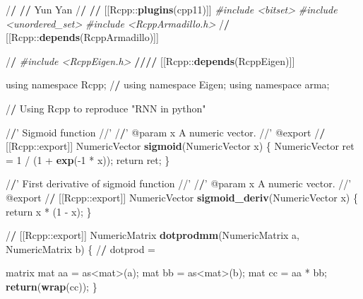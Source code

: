\documentclass[]{article}
\newenvironment{Shaded}{\begin{snugshade}}{\end{snugshade}}
\newcommand{\KeywordTok}[1]{\textcolor[rgb]{0.13,0.29,0.53}{\textbf{{#1}}}}
\newcommand{\DecValTok}[1]{\textcolor[rgb]{0.00,0.00,0.81}{{#1}}}
\newcommand{\StringTok}[1]{\textcolor[rgb]{0.31,0.60,0.02}{{#1}}}
\newcommand{\CommentTok}[1]{\textcolor[rgb]{0.56,0.35,0.01}{\textit{{#1}}}}
\newcommand{\ErrorTok}[1]{\textcolor[rgb]{0.64,0.00,0.00}{\textbf{{#1}}}}
\newcommand{\NormalTok}[1]{{#1}}
\begin{document}
\begin{Shaded}
\begin{Highlighting}[]
\NormalTok{/}\ErrorTok{/}\StringTok{ }
\ErrorTok{//}\StringTok{ }\NormalTok{Yun Yan}
\NormalTok{/}\ErrorTok{/}\StringTok{ }
\ErrorTok{//}\StringTok{ }\NormalTok{[[Rcpp::}\KeywordTok{plugins}\NormalTok{(cpp11)]]}
\CommentTok{#include <bitset>}
\CommentTok{#include <unordered_set>}
\CommentTok{#include <RcppArmadillo.h>}
\NormalTok{/}\ErrorTok{/}\StringTok{ }\NormalTok{[[Rcpp::}\KeywordTok{depends}\NormalTok{(RcppArmadillo)]]}

\NormalTok{/}\ErrorTok{/}\StringTok{ }\CommentTok{#include <RcppEigen.h>}
\ErrorTok{////}\StringTok{ }\NormalTok{[[Rcpp::}\KeywordTok{depends}\NormalTok{(RcppEigen)]]}

\NormalTok{using namespace Rcpp;}
\NormalTok{/}\ErrorTok{/}\StringTok{ }\NormalTok{using namespace Eigen;}
\NormalTok{using namespace arma;}


\NormalTok{/}\ErrorTok{/}\StringTok{ }\NormalTok{Using Rcpp to reproduce }\StringTok{"RNN in python"}

\NormalTok{/}\ErrorTok{/}\StringTok{' Sigmoid function}
\StringTok{//'}
\NormalTok{/}\ErrorTok{/}\StringTok{' @param x A numeric vector.}
\StringTok{//'} \NormalTok{@export}
\NormalTok{/}\ErrorTok{/}\StringTok{ }\NormalTok{[[Rcpp::export]]}
\NormalTok{NumericVector }\KeywordTok{sigmoid}\NormalTok{(NumericVector x) \{}
  \NormalTok{NumericVector ret =}\StringTok{ }\DecValTok{1} \NormalTok{/}\StringTok{ }\NormalTok{(}\DecValTok{1} \NormalTok{+}\StringTok{ }\KeywordTok{exp}\NormalTok{(-}\DecValTok{1} \NormalTok{*}\StringTok{ }\NormalTok{x));}
  \NormalTok{return ret;}
\NormalTok{\}}

\NormalTok{/}\ErrorTok{/}\StringTok{' First derivative of sigmoid function}
\StringTok{//'}
\NormalTok{/}\ErrorTok{/}\StringTok{' @param x A numeric vector.}
\StringTok{//'} \NormalTok{@export}
\NormalTok{/}\ErrorTok{/}\StringTok{ }\NormalTok{[[Rcpp::export]]}
\NormalTok{NumericVector }\KeywordTok{sigmoid_deriv}\NormalTok{(NumericVector x) \{}
  \NormalTok{return x *}\StringTok{ }\NormalTok{(}\DecValTok{1} \NormalTok{-}\StringTok{ }\NormalTok{x);}
\NormalTok{\}}

\NormalTok{/}\ErrorTok{/}\StringTok{ }\NormalTok{[[Rcpp::export]]}
\NormalTok{NumericMatrix }\KeywordTok{dotprodmm}\NormalTok{(NumericMatrix a, NumericMatrix b) \{}
  \NormalTok{/}\ErrorTok{/}\StringTok{ }\NormalTok{dotprod =}\StringTok{ }\NormalTok{matrix %
  \NormalTok{mat aa =}\StringTok{ }\NormalTok{as<mat>(a);}
  \NormalTok{mat bb =}\StringTok{ }\NormalTok{as<mat>(b);}
  \NormalTok{mat cc =}\StringTok{ }\NormalTok{aa *}\StringTok{ }\NormalTok{bb;}
  \KeywordTok{return}\NormalTok{(}\KeywordTok{wrap}\NormalTok{(cc));}
\NormalTok{\}}

}
\end{Highlighting}
\end{Shaded}
\end{document}
